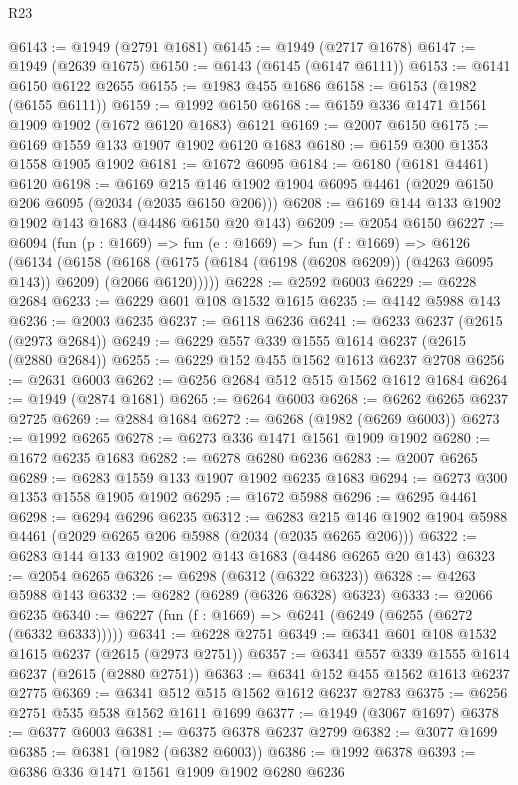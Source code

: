 \begin{lexlean}{R23}
\begin{coremodule}
@6143 := @1949 (@2791 @1681)
@6145 := @1949 (@2717 @1678)
@6147 := @1949 (@2639 @1675)
@6150 := @6143 (@6145 (@6147 @6111))
@6153 := @6141 @6150 @6122 @2655
@6155 := @1983 @455 @1686
@6158 := @6153 (@1982 (@6155 @6111))
@6159 := @1992 @6150
@6168 := @6159 @336 @1471 @1561 @1909 @1902 (@1672 @6120 @1683) @6121
@6169 := @2007 @6150
@6175 := @6169 @1559 @133 @1907 @1902 @6120 @1683
@6180 := @6159 @300 @1353 @1558 @1905 @1902
@6181 := @1672 @6095
@6184 := @6180 (@6181 @4461) @6120
@6198 := @6169 @215 @146 @1902 @1904 @6095 @4461 (@2029 @6150 @206 @6095 (@2034 (@2035 @6150 @206)))
@6208 := @6169 @144 @133 @1902 @1902 @143 @1683 (@4486 @6150 @20 @143)
@6209 := @2054 @6150
@6227 := @6094
    (fun (p : @1669) =>
    fun (e : @1669) =>
    fun (f : @1669) =>
    @6126
      (@6134
        (@6158
          (@6168 (@6175 (@6184 (@6198 (@6208 @6209)) (@4263 @6095 @143)) @6209) (@2066 @6120)))))
@6228 := @2592 @6003
@6229 := @6228 @2684
@6233 := @6229 @601 @108 @1532 @1615
@6235 := @4142 @5988 @143
@6236 := @2003 @6235
@6237 := @6118 @6236
@6241 := @6233 @6237 (@2615 (@2973 @2684))
@6249 := @6229 @557 @339 @1555 @1614 @6237 (@2615 (@2880 @2684))
@6255 := @6229 @152 @455 @1562 @1613 @6237 @2708
@6256 := @2631 @6003
@6262 := @6256 @2684 @512 @515 @1562 @1612 @1684
@6264 := @1949 (@2874 @1681)
@6265 := @6264 @6003
@6268 := @6262 @6265 @6237 @2725
@6269 := @2884 @1684
@6272 := @6268 (@1982 (@6269 @6003))
@6273 := @1992 @6265
@6278 := @6273 @336 @1471 @1561 @1909 @1902
@6280 := @1672 @6235 @1683
@6282 := @6278 @6280 @6236
@6283 := @2007 @6265
@6289 := @6283 @1559 @133 @1907 @1902 @6235 @1683
@6294 := @6273 @300 @1353 @1558 @1905 @1902
@6295 := @1672 @5988
@6296 := @6295 @4461
@6298 := @6294 @6296 @6235
@6312 := @6283 @215 @146 @1902 @1904 @5988 @4461 (@2029 @6265 @206 @5988 (@2034 (@2035 @6265 @206)))
@6322 := @6283 @144 @133 @1902 @1902 @143 @1683 (@4486 @6265 @20 @143)
@6323 := @2054 @6265
@6326 := @6298 (@6312 (@6322 @6323))
@6328 := @4263 @5988 @143
@6332 := @6282 (@6289 (@6326 @6328) @6323)
@6333 := @2066 @6235
@6340 := @6227 (fun (f : @1669) => @6241 (@6249 (@6255 (@6272 (@6332 @6333)))))
@6341 := @6228 @2751
@6349 := @6341 @601 @108 @1532 @1615 @6237 (@2615 (@2973 @2751))
@6357 := @6341 @557 @339 @1555 @1614 @6237 (@2615 (@2880 @2751))
@6363 := @6341 @152 @455 @1562 @1613 @6237 @2775
@6369 := @6341 @512 @515 @1562 @1612 @6237 @2783
@6375 := @6256 @2751 @535 @538 @1562 @1611 @1699
@6377 := @1949 (@3067 @1697)
@6378 := @6377 @6003
@6381 := @6375 @6378 @6237 @2799
@6382 := @3077 @1699
@6385 := @6381 (@1982 (@6382 @6003))
@6386 := @1992 @6378
@6393 := @6386 @336 @1471 @1561 @1909 @1902 @6280 @6236

\end{coremodule}
\end{lexlean}
